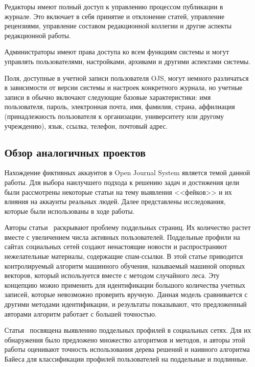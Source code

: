 Редакторы имеют полный доступ к управлению процессом публикации в журнале. Это включает в себя принятие и отклонение статей, управление рецензиями, управление составом редакционной коллегии и другие аспекты редакционной работы.

Администраторы имеют права доступа ко всем функциям системы и могут управлять пользователями, настройками, архивами и другими аспектами системы.

Поля, доступные в учетной записи пользователя OJS, могут немного различаться в зависимости от версии системы и настроек конкретного журнала, но учетные записи в обычно включают следующие базовые характеристики: имя пользователя, пароль, электронная почта, имя, фамилия, страна, аффилиация (принадлежность пользователя к организации, университету или другому учреждению), язык, ссылка, телефон, почтовый адрес.

\vspace{1.5em}
\subsection{Обзор аналогичных проектов}
\label{subsec:Variants}

Нахождение фиктивных аккаунтов в Open Journal System является темой данной работы. Для выбора наилучшего подхода к решению задач и достижения цели были рассмотрены некоторые статьи на тему выявления <<фейков>> и их влияния на аккаунты реальных людей. Далее представлены исследования, которые были использованы в ходе работы.

Авторы статьи~\cite{HassanAA23} раскрывают проблему поддельных страниц. Их количество растет вместе с увеличением числа активных пользователей. Поддельные профили на сайтах социальных сетей создают ненастоящие новости и распространяют нежелательные материалы, содержащие спам-ссылки. В этой статье приводится контролируемый алгоритм машинного обучения, называемый машиной опорных векторов, который используется вместе с методом случайного леса. Эту концепцию можно применить для идентификации большого количества учетных записей, которые невозможно проверить вручную. Данная модель сравнивается с другими методами идентификации, и результаты показывают, что предложенный авторами алгоритм работает с большей точностью. 

Статья~\cite{ElyusufiEK19} посвящена выявлению поддельных профилей в социальных сетях. Для их обнаружения было предложено множество алгоритмов и методов, и авторы этой работы оценивают точность использования дерева решений и наивного алгоритма Байеса для классификации профилей пользователей на поддельные и подлинные.

